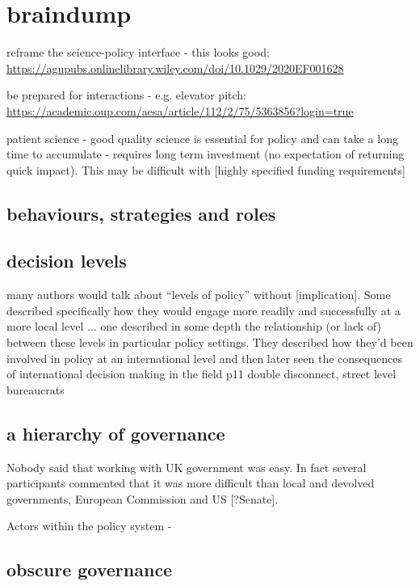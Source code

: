 \section{braindump}

reframe the science-policy interface - this looks good: \url{https://agupubs.onlinelibrary.wiley.com/doi/10.1029/2020EF001628}

be prepared for interactions - e.g. elevator pitch: \url{https://academic.oup.com/aesa/article/112/2/75/5363856?login=true}

patient science - good quality science is essential for policy and can take a long time to accumulate - requires long term investment (no expectation of returning quick impact). This may be difficult with [highly specified funding requirements]


\subsection{behaviours, strategies and roles}

\subsection{decision levels}
many authors would talk about ``levels of policy'' without [implication]. Some described specifically how they would engage more readily and successfully at a more local level ... one described in some depth the relationship (or lack of) between these levels in particular policy settings. They described how they'd been involved in policy at an international level and then later seen the consequences of international decision making in the field p11 double disconnect, street level bureaucrats

\subsection{a hierarchy of governance}
Nobody said that working with UK government was easy. In fact several participants commented that it was more difficult than local and devolved governments, European Commission and US [?Senate]. 

Actors within the policy system - 

\subsection{obscure governance}

